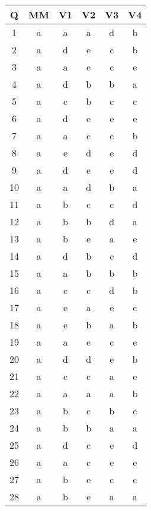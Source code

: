 \documentclass[amsfonts,bezier,leqno,fleqn,12pt,a4paper]{article}
\begin{document}
{{{{\begin{normalsize}
\begin{center}
\begin{tabular}{|c||c|c|c|c|c|}
\hline
Q & MM & V1& V2& V3& V4\\
\hline \hline
1 & a  & a & a & d & b \\ \hline
2 & a  & d & e & c & b \\ \hline
3 & a  & a & e & c & e \\ \hline
4 & a  & d & b & b & a \\ \hline
5 & a  & c & b & c & c \\ \hline
6 & a  & d & e & e & e \\ \hline
7 & a  & a & c & c & b \\ \hline
8 & a  & e & d & e & d \\ \hline
9 & a  & d & e & e & d \\ \hline
10 & a  & a & d & b & a \\ \hline
11 & a  & b & c & c & d \\ \hline
12 & a  & b & b & d & a \\ \hline
13 & a  & b & e & a & e \\ \hline
14 & a  & d & b & c & d \\ \hline
15 & a  & a & b & b & b \\ \hline
16 & a  & c & c & d & b \\ \hline
17 & a  & e & a & e & c \\ \hline
18 & a  & e & b & a & b \\ \hline
19 & a  & a & e & c & e \\ \hline
20 & a  & d & d & e & b \\ \hline
21 & a  & c & c & a & e \\ \hline
22 & a  & a & a & a & b \\ \hline
23 & a  & b & c & b & c \\ \hline
24 & a  & b & b & a & a \\ \hline
25 & a  & d & c & e & d \\ \hline
26 & a  & a & c & e & e \\ \hline
27 & a  & b & e & c & c \\ \hline
28 & a  & b & e & a & a \\ \hline
\end{tabular}
\end{center}
\newpage
\end{normalsize}
\renewcommand{\thepage}{\noindent Math 101, Final Exam, Term 162 \hfill \arabic{page} \hfill {\bf \fbox{Answer Counts}}}

}}}}
\end{document}
